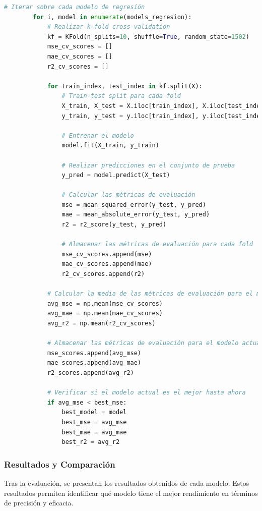 \begin{lstlisting}[language=Python, caption=Codigo de evaluacion de modelos, label=lst:cod_Eval]
        # Iterar sobre cada modelo de regresión
        for i, model in enumerate(models_regresion):
            # Realizar k-fold cross-validation
            kf = KFold(n_splits=10, shuffle=True, random_state=1502)
            mse_cv_scores = []
            mae_cv_scores = []
            r2_cv_scores = []
            
            for train_index, test_index in kf.split(X):
                # Train-test split para cada fold
                X_train, X_test = X.iloc[train_index], X.iloc[test_index]
                y_train, y_test = y.iloc[train_index], y.iloc[test_index]
                
                # Entrenar el modelo
                model.fit(X_train, y_train)
                
                # Realizar predicciones en el conjunto de prueba
                y_pred = model.predict(X_test)
                
                # Calcular las métricas de evaluación
                mse = mean_squared_error(y_test, y_pred)
                mae = mean_absolute_error(y_test, y_pred)
                r2 = r2_score(y_test, y_pred)
                
                # Almacenar las métricas de evaluación para cada fold
                mse_cv_scores.append(mse)
                mae_cv_scores.append(mae)
                r2_cv_scores.append(r2)
                
            # Calcular la media de las métricas de evaluación para el modelo actual
            avg_mse = np.mean(mse_cv_scores)
            avg_mae = np.mean(mae_cv_scores)
            avg_r2 = np.mean(r2_cv_scores)
            
            # Almacenar las métricas de evaluación para el modelo actual
            mse_scores.append(avg_mse)
            mae_scores.append(avg_mae)
            r2_scores.append(avg_r2)
            
            # Verificar si el modelo actual es el mejor hasta ahora
            if avg_mse < best_mse:
                best_model = model
                best_mse = avg_mse
                best_mae = avg_mae
                best_r2 = avg_r2
    \end{lstlisting}


\subsubsection{Resultados y Comparación}
Tras la evaluación, se presentan los resultados obtenidos de cada modelo. Estos resultados permiten identificar qué modelo tiene el mejor rendimiento en términos de precisión y eficacia.

